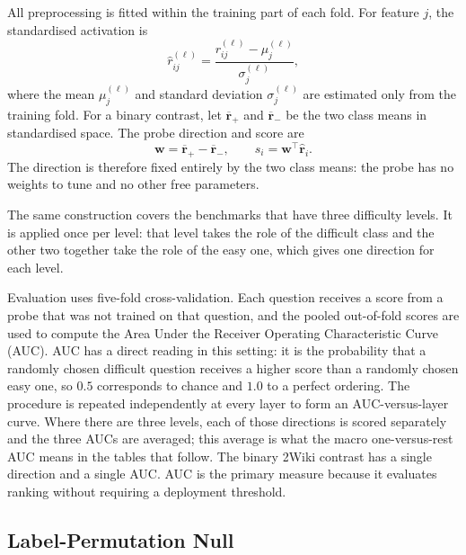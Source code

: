 All preprocessing is fitted within the training part of each fold. For feature
\(j\), the standardised activation is
\begin{equation}
  \widehat{r}^{(\ell)}_{ij}
  =\frac{r^{(\ell)}_{ij}-\mu^{(\ell)}_j}
         {\sigma^{(\ell)}_j},
  \label{eq:fold-standardisation}
\end{equation}
where the mean \(\mu^{(\ell)}_j\) and standard deviation
\(\sigma^{(\ell)}_j\) are estimated only from the training fold. For a binary
contrast, let \(\overline{\mathbf{r}}_{+}\) and
\(\overline{\mathbf{r}}_{-}\) be the two class means in standardised space.
The probe direction and score are
\begin{equation}
  \mathbf{w}=\overline{\mathbf{r}}_{+}
             -\overline{\mathbf{r}}_{-},
  \qquad
  s_i=\mathbf{w}^{\top}\widehat{\mathbf{r}}_i.
  \label{eq:diagonal-lda-probe}
\end{equation}
The direction is therefore fixed entirely by the two class means: the probe
has no weights to tune and no other free parameters.

The same construction covers the benchmarks that have three difficulty levels.
It is applied once per level: that level takes the role of the difficult class
and the other two together take the role of the easy one, which gives one
direction for each level.

Evaluation uses five-fold cross-validation. Each question receives a score from
a probe that was not trained on that question, and the pooled out-of-fold scores
are used to compute the Area Under the Receiver Operating Characteristic Curve
(AUC). AUC has a direct reading in this setting: it is the probability that a
randomly chosen difficult question receives a higher score than a randomly
chosen easy one, so \(0.5\) corresponds to chance and \(1.0\) to a perfect
ordering. The procedure is repeated independently at every layer to form an
AUC-versus-layer curve. Where there are three levels, each of those
directions is scored separately and the three AUCs are averaged; this average
is what the macro one-versus-rest AUC means in the tables that follow. The
binary 2Wiki contrast has a single direction and a single AUC. AUC is the primary measure because it evaluates ranking without requiring
a deployment threshold.

\subsection{Label-Permutation Null}
\label{subsec:permutation-null}


